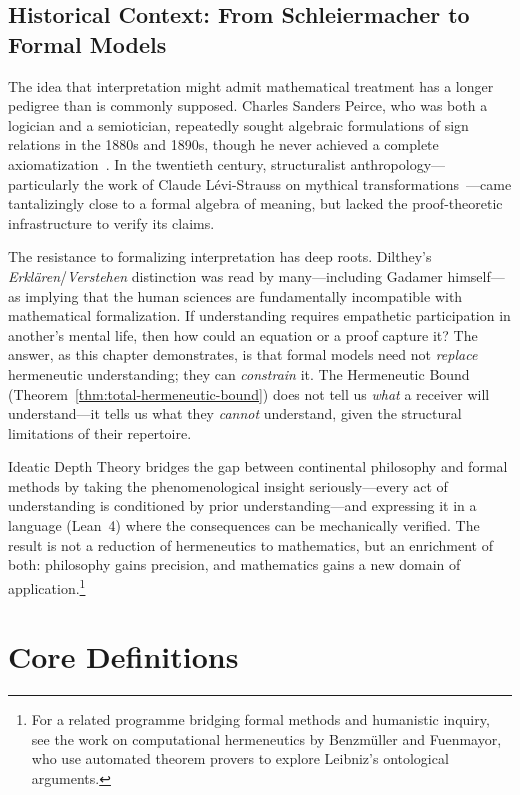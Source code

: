 \subsection*{Historical Context: From Schleiermacher to Formal Models}

The idea that interpretation might admit mathematical treatment has a
longer pedigree than is commonly supposed.  Charles Sanders Peirce, who
was both a logician and a semiotician, repeatedly sought algebraic
formulations of sign relations in the 1880s and 1890s, though he never
achieved a complete axiomatization~\cite{peirce1931}.  In the
twentieth century, structuralist anthropology---particularly the work
of Claude L\'evi-Strauss on mythical transformations~\cite{levistrauss1962}---came
tantalizingly close to a formal algebra of meaning, but lacked the
proof-theoretic infrastructure to verify its claims.

The resistance to formalizing interpretation has deep roots.  Dilthey's
\emph{Erkl\"aren}/\emph{Verstehen} distinction was read by many---including
Gadamer himself---as implying that the human sciences are fundamentally
incompatible with mathematical formalization.  If understanding requires
empathetic participation in another's mental life, then how could an
equation or a proof capture it?  The answer, as this chapter
demonstrates, is that formal models need not \emph{replace}
hermeneutic understanding; they can \emph{constrain} it.  The
Hermeneutic Bound (Theorem~\ref{thm:total-hermeneutic-bound}) does
not tell us \emph{what} a receiver will understand---it tells us what
they \emph{cannot} understand, given the structural limitations of
their repertoire.

Ideatic Depth Theory bridges the gap between continental philosophy and
formal methods by taking the phenomenological insight seriously---every
act of understanding is conditioned by prior understanding---and
expressing it in a language (Lean~4) where the consequences can be
mechanically verified.  The result is not a reduction of hermeneutics to
mathematics, but an enrichment of both: philosophy gains precision, and
mathematics gains a new domain of application.\footnote{For a related
programme bridging formal methods and humanistic inquiry, see the work on
computational hermeneutics by Benzm\"uller and Fuenmayor, who use
automated theorem provers to explore Leibniz's ontological arguments.}

\section{Core Definitions}
\label{sec:ch1:core}

